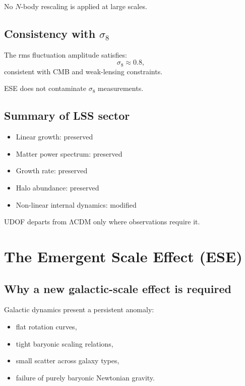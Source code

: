\documentclass[11pt]{book}
\begin{document}
No $N$-body rescaling is applied at large scales.

\section{Consistency with $\sigma_8$}

The rms fluctuation amplitude satisfies:
\begin{equation}
\sigma_8 \approx 0.8,
\end{equation}
consistent with CMB and weak-lensing constraints.

ESE does not contaminate $\sigma_8$ measurements.

\section{Summary of LSS sector}

\begin{itemize}
\item Linear growth: preserved
\item Matter power spectrum: preserved
\item Growth rate: preserved
\item Halo abundance: preserved
\item Non-linear internal dynamics: modified
\end{itemize}

UDOF departs from ΛCDM only where observations require it.

\chapter{The Emergent Scale Effect (ESE)}

\section{Why a new galactic-scale effect is required}

Galactic dynamics present a persistent anomaly:
\begin{itemize}
\item flat rotation curves,
\item tight baryonic scaling relations,
\item small scatter across galaxy types,
\item failure of purely baryonic Newtonian gravity.
\end{itemize}
\end{document}

